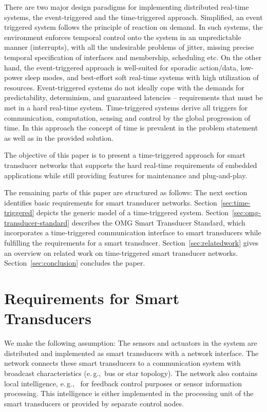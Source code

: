 \documentclass[11pt,a4paper,]{article}
\def\eg{e.\,g.,~}
\begin{document}
There are two major design paradigms for implementing distributed
real-time systems, the event-triggered and the time-triggered
approach. Simplified, an event triggered system follows the
principle of reaction on demand. In such systems, the environment
enforces temporal control onto the system in an unpredictable
manner (interrupts), with all the undesirable problems of jitter,
missing precise temporal specification of interfaces and
membership, scheduling etc. On the other hand, the event-triggered
approach is well-suited for sporadic action/data, low-power sleep
modes, and best-effort soft real-time systems with high
utilization of resources. Event-triggered systems do not ideally
cope with the demands for predictability, determinism, and
guaranteed latencies -- requirements that must be met in a hard
real-time system.
Time-triggered systems derive all triggers for communication,
computation, sensing and control by the global progression of
time. In this approach the concept of time is prevalent in the
problem statement as well as in the provided solution.

The objective of this paper is to present a time-triggered
approach for smart transducer networks that supports the hard
real-time requirements of embedded applications while still
providing features for maintenance and plug-and-play.

The remaining parts of this paper are structured as follows: The
next section identifies basic requirements for smart transducer
networks. Section~\ref{sec:time-triggered} depicts the generic model
of a time-triggered system.
Section~\ref{sec:omg-transducer-standard} describes the \ac{OMG}
Smart Transducer Standard, which incorporates a time-triggered
communication interface to smart transducers while fulfilling the
requirements for a smart transducer. Section~\ref{sec:relatedwork}
gives an overview on related work on time-triggered smart transducer
networks. Section~\ref{sec:conclusion} concludes the paper.


\section{Requirements for Smart Transducers}

We make the following assumption: The sensors and actuators in the
system are distributed and implemented as smart transducers with a
network interface. The network connects these smart transducers to
a communication system with broadcast characteristics (\eg bus or
star topology). The network also contains local intelligence, \eg
for feedback control purposes or sensor information processing.
This intelligence is either implemented in the processing unit of
the smart transducers or provided by separate control nodes.
\end{document}
